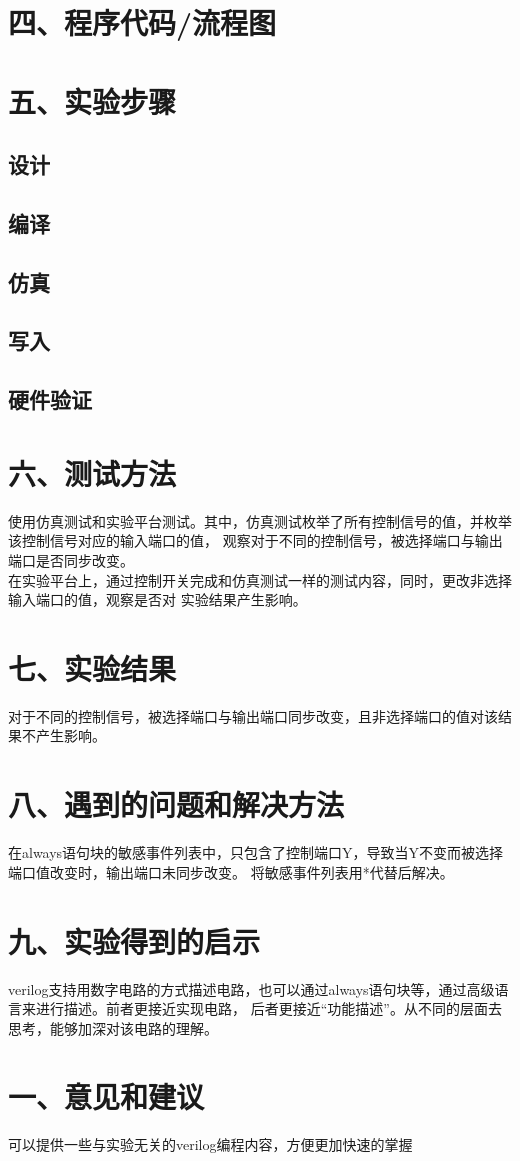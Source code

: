 \documentclass{report}
\begin{document}
\section*{四、程序代码/流程图}
\section*{五、实验步骤}
\subsection*{设计}
\subsection*{编译}
\subsection*{仿真}
\subsection*{写入}
\subsection*{硬件验证}
\section*{六、测试方法}
使用仿真测试和实验平台测试。其中，仿真测试枚举了所有控制信号的值，并枚举该控制信号对应的输入端口的值，
观察对于不同的控制信号，被选择端口与输出端口是否同步改变。\\
在实验平台上，通过控制开关完成和仿真测试一样的测试内容，同时，更改非选择输入端口的值，观察是否对
实验结果产生影响。
\section*{七、实验结果}
对于不同的控制信号，被选择端口与输出端口同步改变，且非选择端口的值对该结果不产生影响。
\section*{八、遇到的问题和解决方法}
在always语句块的敏感事件列表中，只包含了控制端口Y，导致当Y不变而被选择端口值改变时，输出端口未同步改变。
将敏感事件列表用*代替后解决。
\section*{九、实验得到的启示}
verilog支持用数字电路的方式描述电路，也可以通过always语句块等，通过高级语言来进行描述。前者更接近实现电路，
后者更接近“功能描述”。从不同的层面去思考，能够加深对该电路的理解。
\section*{一、意见和建议}
可以提供一些与实验无关的verilog编程内容，方便更加快速的掌握
\end{document}

